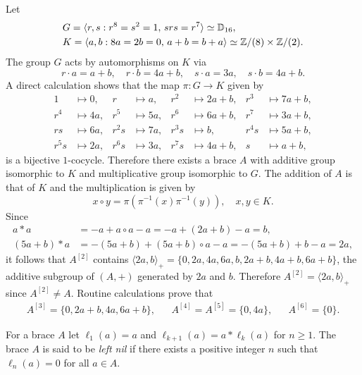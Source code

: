 \begin{example}
    \label{exa:funny}
    Let
    \begin{align*}
        &G=\langle r,s:r^8=s^2=1,\,srs=r^7\rangle\simeq\mathbb{D}_{16},\\
        &K=\langle a,b:8a=2b=0,\,a+b=b+a\rangle\simeq \mathbb{Z}/(8)\times \mathbb{Z}/(2).
    \end{align*}
    The group $G$ acts by automorphisms on $K$ via
    \[
        r\cdot a=a+b,\quad r\cdot b=4a+b,\quad
        s\cdot a=3a, \quad s\cdot b=4a+b.
    \]
    A direct calculation shows that the map $\pi\colon G\to K$  given by
    \begin{align*}
        1 &\mapsto 0, & r&\mapsto a, & r^2&\mapsto 2a+b, & r^3&\mapsto 7a+b,\\
        r^4 &\mapsto 4a, & r^5&\mapsto 5a, & r^6&\mapsto 6a+b, & r^7&\mapsto 3a+b,\\
        rs &\mapsto 6a, & r^2s&\mapsto 7a, & r^3s&\mapsto b, &r^4s&\mapsto 5a+b,\\
        r^5s &\mapsto 2a, & r^6s&\mapsto 3a, &r^7s&\mapsto 4a+b,&s&\mapsto a+b,
    \end{align*}
    is a bijective $1$-cocycle. Therefore there exists a brace $A$ with
    additive group isomorphic to $K$ and multiplicative group isomorphic to
    $G$. The addition of $A$ is that of $K$ and the multiplication is given by
    \[
        x\circ y=\pi(\pi^{-1}(x)\pi^{-1}(y)),\quad x,y\in K.
    \]
    Since
    \begin{align*}
        a*a&=-a+a\circ a-a=-a+(2a+b)-a=b,\\
        (5a+b)*a&=-(5a+b)+(5a+b)\circ a-a=-(5a+b)+b-a=2a,
    \end{align*}
    it follows that $A^{[2]}$ contains $\langle
    2a,b\rangle_+=\{0,2a,4a,6a,b,2a+b,4a+b,6a+b\}$, the additive subgroup of
    $(A,+)$ generated by $2a$ and $b$. Therefore $A^{[2]}=\langle 2a,b\rangle_+$
    since $A^{[2]}\ne A$. Routine calculations prove that
    \begin{align*}
        A^{[3]}=\{0,2a+b,4a,6a+b\}, && A^{[4]}=A^{[5]}=\{0,4a\}, && A^{[6]}=\{0\}.
    \end{align*}
\end{example}


\begin{definition}
For a brace $A$ let $\ell_1(a)=a$ and $\ell_{k+1}(a)=a*\ell_k(a)$ for
$n\geq1$.  The brace $A$ is said to be \emph{left nil} if there
exists a positive integer $n$ such that $\ell_n(a)=0$ for all $a\in A$. 
\end{definition}

